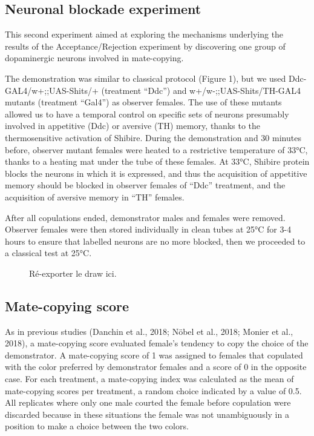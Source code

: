 \documentclass[a4paper, 12pt]{article}
\begin{document}
	\subsection{Neuronal blockade experiment}
	
	This second experiment aimed at exploring the mechanisms underlying the results of the Acceptance/Rejection experiment by discovering one group of dopaminergic neurons involved in mate-copying.
	
	The demonstration was similar to classical protocol (Figure 1), but we used Ddc-GAL4/w+;;UAS-Shits/+ (treatment “Ddc”) and w+/w-;;UAS-Shits/TH-GAL4 mutants (treatment “Gal4”) as observer females. The use of these mutants allowed us to have a temporal control on specific sets of neurons presumably involved in appetitive (Ddc) or aversive (TH) memory, thanks to the thermosensitive activation of Shibire. During the demonstration and 30 minutes before, observer mutant females were heated to a restrictive temperature of 33°C, thanks to a heating mat under the tube of these females. At 33°C, Shibire protein blocks the neurons in which it is expressed, and thus the acquisition of appetitive memory should be blocked in observer females of “Ddc” treatment, and the acquisition of aversive memory in “TH” females. 
	
	After all copulations ended, demonstrator males and females were removed. Observer females were then stored individually in clean tubes at 25°C for 3-4 hours to ensure that labelled neurons are no more blocked, then we proceeded to a classical test at 25°C.

	\begin{figure}
		\caption{Ré-exporter le draw ici.}
	\end{figure}

	\subsection{Mate-copying score}

	As in previous studies (Danchin et al., 2018; Nöbel et al., 2018; Monier et al., 2018), a mate-copying score evaluated female’s tendency to copy the choice of the demonstrator. A mate-copying score of 1 was assigned to females that copulated with the color preferred by demonstrator females and a score of 0 in the opposite case. For each treatment, a mate-copying index was calculated as the mean of mate-copying scores per treatment, a random choice indicated by a value of 0.5. All replicates where only one male courted the female before copulation were discarded because in these situations the female was not unambiguously in a position to make a choice between the two colors.
\end{document}
